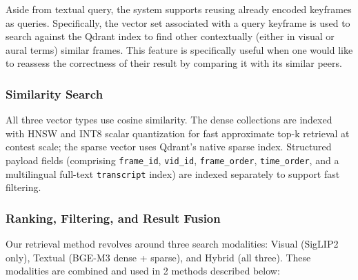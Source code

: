 \documentclass[11pt,a4paper]{article}
\begin{document}
Aside from textual query, the system supports reusing already encoded keyframes as queries. Specifically, the vector set associated with a query keyframe is used to search against the Qdrant index to find other contextually (either in visual or aural terms) similar frames. This feature is specifically useful when one would like to reassess the correctness of their result by comparing it with its similar peers.

\subsubsection{Similarity Search}

All three vector types use cosine similarity. The dense collections are indexed with HNSW and INT8 scalar quantization for fast approximate top-k retrieval at contest scale; the sparse vector uses Qdrant's native sparse index. Structured payload fields (comprising \texttt{frame\_id}, \texttt{vid\_id}, \texttt{frame\_order}, \texttt{time\_order}, and a multilingual full-text \texttt{transcript} index) are indexed separately to support fast filtering.

\subsubsection{Ranking, Filtering, and Result Fusion}

Our retrieval method revolves around three search modalities: Visual (SigLIP2 only), Textual (BGE-M3 dense + sparse), and Hybrid (all three). These modalities are combined and used in 2 methods described below:
\end{document}
